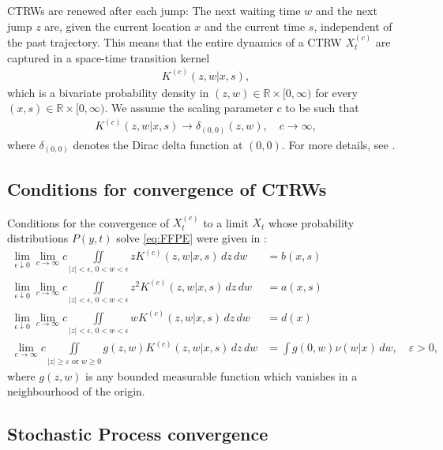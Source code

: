 \documentclass[a4paper,12pt]{elsarticle}
\numberwithin{equation}{section}
\theoremstyle{plain}
\theoremstyle{definition}
\theoremstyle{remark}
\numberwithin{equation}{section}
\newcommand{\spc}{\mathbb R}
\newcommand{\spctim}{\spc \times [0,\infty)}
\newcommand{\1}{\mathbf 1}
\begin{document}
CTRWs are renewed after each jump: The next waiting time $w$ and the next jump $z$ are, given the current location $x$ and the current time $s$, independent of the past trajectory.  This means that the entire dynamics of a CTRW $X^{(c)}_t$ are captured in a space-time transition kernel
\begin{align} \label{eq:STJK}
K^{(c)}(z,w | x,s),
\end{align}
which is a bivariate probability density in $(z,w) \in \spctim$ for every $(x,s) \in \spctim$.  We assume the scaling parameter $c$ to be such that
\begin{align}
K^{(c)}(z,w | x,s) \to \delta_{(0,0)}(z,w), \quad c \to \infty,
\end{align}
where $\delta_{(0,0)}$ denotes the Dirac delta function at $(0,0)$. For more details, see \cite{Straka17}.


\subsection{Conditions for convergence of CTRWs}

Conditions for the convergence of $X^{(c)}_t$ to a limit $X_t$ whose probability distributions $P(y,t)$ solve \eqref{eq:FFPE} were given in \cite{Straka17}:
\begin{align} \label{eq:cond1}
\lim_{\epsilon \downarrow 0} \lim_{c \to \infty}
c \iint\limits_{|z|< \epsilon,\,0<  w < \epsilon} z K^{(c)}(z,w | x,s)\,dz\,dw &= b(x,s)
\\ \label{eq:cond2}
\lim_{\epsilon \downarrow 0} \lim_{c \to \infty}
c \iint\limits_{|z|< \epsilon, \,0<w < \epsilon} z^2 K^{(c)}(z,w | x,s)\,dz\,dw &= a(x,s)
\\ \label{eq:cond3}
\lim_{\epsilon \downarrow 0} \lim_{c \to \infty}
c \iint\limits_{|z|< \epsilon, \,0<w < \epsilon} w K^{(c)}(z,w | x,s)\,dz\,dw &= d(x)
\\
\label{eq:cond4}
\lim_{c \to \infty}
c \iint\limits_{|z| \ge \varepsilon \text{ or } w \ge 0} g(z,w) K^{(c)} (z,w | x,s)\,dz\,dw &= \int g(0,w) \nu(w|x)\,dw, \quad \varepsilon > 0,
\end{align}
where $g(z,w)$ is any bounded measurable function which vanishes in a neighbourhood of the origin.


\subsection{Stochastic Process convergence}
\end{document}

